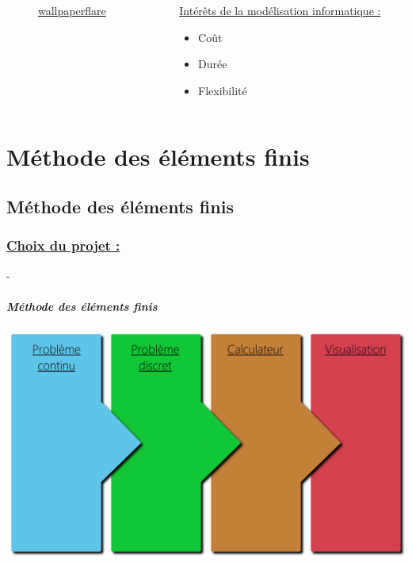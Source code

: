 \documentclass[10pt]{beamer}
\begin{document}
\begin{frame}
\begin{columns}[t]
\begin{column}{5cm}
\begin{figure}
   					\caption{\href{https://www.wallpaperflare.com/black-cables-connection-data-electronics-equipment-ethernet-wallpaper-aryet}{wallpaperflare}}
				\end{figure}
  			\end{column}
 			\begin{column}{5cm}
 				\begin{block}{}
 					\uline{Int\'er\^ets de la mod\'elisation informatique :}
					\begin{itemize}
						\item Co\^ut
						\item Dur\'ee
						\item Flexibilit\'e
					\end{itemize}
				\end{block}
			 \end{column}
 		\end{columns}
	\end{frame}
	
	\section{M\'ethode des \'el\'ements finis}
	\subsection{M\'ethode des \'el\'ements finis}
	\begin{frame}
		\frametitle{\uline{Choix du projet :}}-
		\framesubtitle{\textit{M\'ethode des \'el\'ements finis}}
		\centering
		\includegraphics[scale=4.5]{Images/MethodeDesElementsFinis.png}
	\end{frame}
\end{document}
